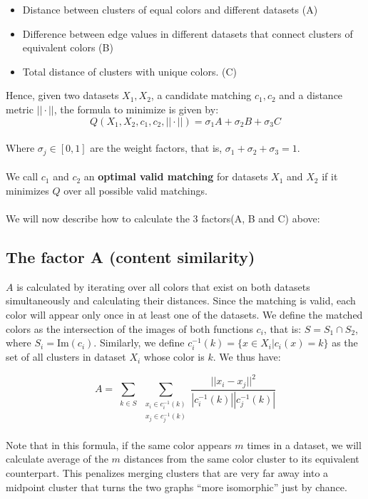 \documentclass[11pt]{article}
\begin{document}
\begin{itemize}
\item Distance between clusters of equal colors and different datasets (A)
\item Difference between edge values in different datasets that connect clusters of equivalent colors (B)
\item Total distance of clusters with unique colors. (C)
\end{itemize}
Hence, given two datasets $X_1, X_2$, a candidate matching $c_1, c_2$ and a distance metric $|| \cdot ||$, the formula to minimize is given by:
$$
Q(X_1, X_2, c_1, c_2, ||\cdot||) = \sigma_1 A + \sigma_2 B + \sigma_3 C
$$
\\
Where $\sigma_j \in [0,1]$ are the weight factors, that is, $\sigma_1 + \sigma_2 + \sigma_3 = 1$. \\
\\
We call $c_1$ and $c_2$ an \textbf{optimal valid matching} for datasets $X_1$ and $X_2$ if it minimizes $Q$ over all possible valid matchings. 
\\
\\
We will now describe how to calculate the 3 factors(A, B and C) above:

\subsection{The factor A (content similarity)}
$A$ is calculated by iterating over all colors that exist on both datasets simultaneously and calculating their distances. Since the matching is valid, each color will appear only once in at least one of the datasets. We define the matched colors as the intersection of the images of both functions $c_i$, that is: $S = S_1 \cap S_2$, where $S_i = \mbox{Im} (c_i)$. Similarly, we define $c_{i}^{-1}(k) = \{x \in X_i | c_i(x) = k\}$ as the set of all clusters in dataset $X_i$ whose color is $k$. We thus have:

$$
A = \sum_{\substack{k \in S}} \sum_{\substack{x_i \in c_{i}^{-1}(k) \\ x_j \in c_{j}^{-1}(k)}} \frac{||x_i - x_j||^2}{|c_{i}^{-1}(k)| |c_{j}^{-1}(k)|}
$$
\\
Note that in this formula, if the same color appears $m$ times in a dataset, we will calculate average of the $m$ distances from the same color cluster to its equivalent counterpart. This penalizes merging clusters that are very far away into a midpoint cluster that turns the two graphs ``more isomorphic'' just by chance. 
\end{document}
